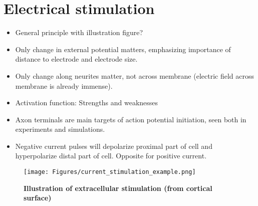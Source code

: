 \section{Electrical stimulation}

\begin{itemize}
\item General principle with illustration figure?
\item Only change in external potential matters, emphasizing importance of distance to electrode and electrode size.
\item Only change along neurites matter, not across membrane (electric field across membrane is already immense).
\item Activation function: Strengths and weaknesses
\item Axon terminals are main targets of action potential initiation, seen both in experiments and simulations.
\item Negative current pulses will depolarize proximal part of cell and hyperpolarize distal part of cell. Opposite for positive current.
\end{itemize}

\begin{figure}[!ht]
\begin{center}
\texttt{[image: Figures/current\_stimulation\_example.png]}
\end{center}
\caption{\textbf{Illustration of extracellular stimulation (from cortical surface)} 
}
\label{fig:current_stimulation_example}
\end{figure}

